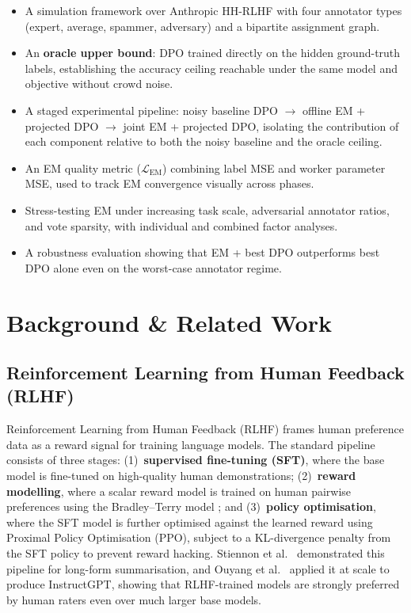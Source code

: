 \documentclass[11pt, a4paper]{article}
\begin{document}
\begin{itemize}[noitemsep]
  \item A simulation framework over Anthropic HH-RLHF with four annotator types
        (expert, average, spammer, adversary) and a bipartite assignment graph.
  \item An \textbf{oracle upper bound}: DPO trained directly on the hidden ground-truth
        labels, establishing the accuracy ceiling reachable under the same model and
        objective without crowd noise.
  \item A staged experimental pipeline: noisy baseline DPO $\to$ offline EM + projected
        DPO $\to$ joint EM + projected DPO, isolating the contribution of each component
        relative to both the noisy baseline and the oracle ceiling.
  \item An EM quality metric ($\mathcal{L}_\text{EM}$) combining label MSE and worker
        parameter MSE, used to track EM convergence visually across phases.
  \item Stress-testing EM under increasing task scale, adversarial annotator ratios, and
        vote sparsity, with individual and combined factor analyses.
  \item A robustness evaluation showing that EM + best DPO outperforms best DPO alone
        even on the worst-case annotator regime.
\end{itemize}

\newpage

\section{Background \& Related Work}

\subsection{Reinforcement Learning from Human Feedback (RLHF)}

Reinforcement Learning from Human Feedback (RLHF) \cite{christiano2017} frames human
preference data as a reward signal for training language models. The standard pipeline
consists of three stages: (1)~\textbf{supervised fine-tuning (SFT)}, where the base model
is fine-tuned on high-quality human demonstrations; (2)~\textbf{reward modelling}, where a
scalar reward model is trained on human pairwise preferences using the Bradley--Terry model
\cite{bradley1952}; and (3)~\textbf{policy optimisation}, where the SFT model is further
optimised against the learned reward using Proximal Policy Optimisation (PPO), subject to a
KL-divergence penalty from the SFT policy to prevent reward hacking. Stiennon et al.\
\cite{stiennon2020} demonstrated this pipeline for long-form summarisation, and Ouyang et
al.\ \cite{ouyang2022} applied it at scale to produce InstructGPT, showing that RLHF-trained
models are strongly preferred by human raters even over much larger base models.
\end{document}
